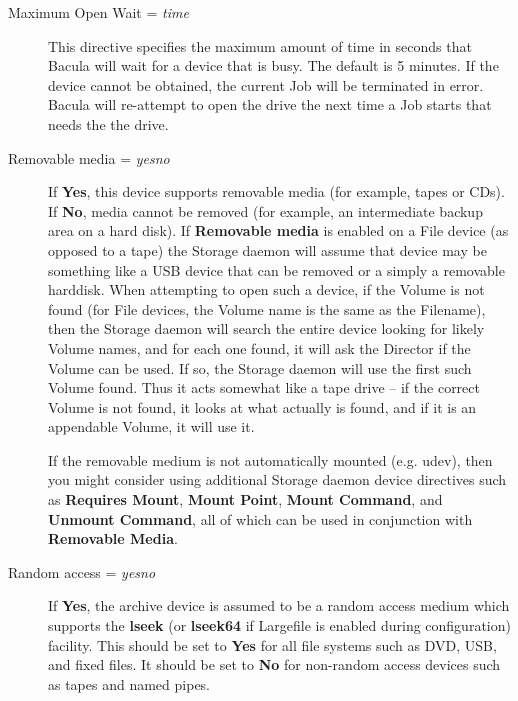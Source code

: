 \begin{description}
\item [Maximum Open Wait = {\it time}]
   This directive specifies the maximum amount of time in seconds that
   Bacula will wait for a device that is busy.  The default is 5 minutes.
   If the device cannot be obtained, the current Job will be terminated in
   error.  Bacula will re-attempt to open the drive the next time a Job
   starts that needs the the drive.

\label{removablemedia}
\item [Removable media = {\it yes\vb{}no}]
   If {\bf Yes}, this device supports removable media (for example, tapes
   or CDs).  If {\bf No}, media cannot be removed (for example, an
   intermediate backup area on a hard disk). If {\bf Removable media} is
   enabled on a File device (as opposed to a tape) the Storage daemon will
   assume that device may be something like a USB device that can be
   removed or a simply a removable harddisk. When attempting to open
   such a device, if the Volume is not found (for File devices, the Volume
   name is the same as the Filename), then the Storage daemon will search
   the entire device looking for likely Volume names, and for each one 
   found, it will ask the Director if the Volume can be used.  If so,
   the Storage daemon will use the first such Volume found.  Thus it
   acts somewhat like a tape drive -- if the correct Volume is not found,
   it looks at what actually is found, and if it is an appendable Volume,
   it will use it.

   If the removable medium is not automatically mounted (e.g. udev), then
   you might consider using additional Storage daemon device directives
   such as {\bf Requires Mount}, {\bf Mount Point}, {\bf Mount Command},
   and {\bf Unmount Command}, all of which can be used in conjunction with
   {\bf Removable Media}.    


\item [Random access = {\it yes\vb{}no}]
   If {\bf Yes}, the archive device is assumed to be a random access medium
   which supports the {\bf lseek} (or {\bf lseek64} if Largefile is enabled
   during configuration) facility. This should be set to {\bf Yes} for all
   file systems such as DVD, USB, and fixed files.  It should be set to
   {\bf No} for non-random access devices such as tapes and named pipes.



\end{description}
